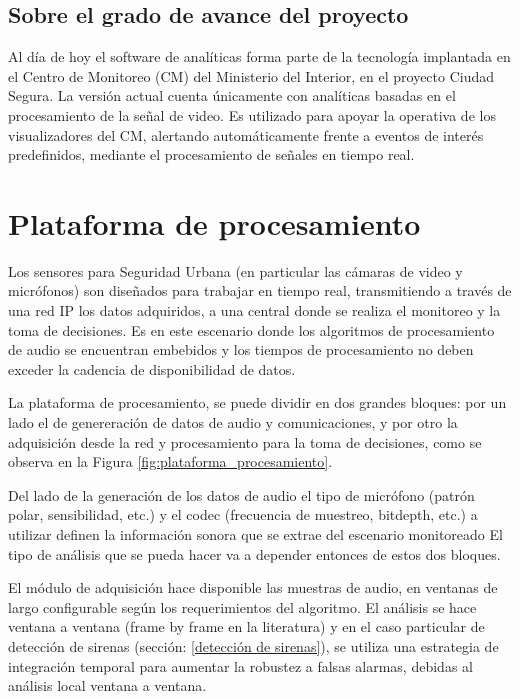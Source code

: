 \documentclass{article}
\begin{document}
\subsection{Sobre el grado de avance del proyecto}                            
Al día de hoy el software de analíticas forma parte de la tecnología implantada en el Centro de Monitoreo (CM) del Ministerio del Interior, en el proyecto Ciudad Segura. La versión actual cuenta únicamente con analíticas basadas en el procesamiento de la señal de video. Es utilizado para apoyar la operativa de los visualizadores del CM, alertando automáticamente frente a eventos de interés predefinidos, mediante el procesamiento de señales en tiempo real.  



\section{Plataforma de procesamiento}
\label{PP}
Los sensores para Seguridad Urbana (en particular las cámaras de video y micrófonos) son diseñados para trabajar en tiempo real, transmitiendo a través de una red IP los datos adquiridos, a una central donde se realiza el monitoreo y la toma de decisiones. Es en este escenario donde los algoritmos de procesamiento de audio se encuentran embebidos y los tiempos de procesamiento no deben exceder la cadencia de disponibilidad de datos.

\smallskip
La plataforma de procesamiento, se puede dividir en dos grandes bloques: por un lado el de genereración de datos de audio y comunicaciones, y por otro la adquisición desde la red y procesamiento para la toma de decisiones, como se observa en la Figura \ref{fig:plataforma_procesamiento}.
\smallskip

Del lado de la generación de los datos de audio el tipo de micrófono (patrón polar, sensibilidad, etc.) y el codec (frecuencia de muestreo, bitdepth, etc.) a utilizar definen la información sonora que se extrae del escenario monitoreado El tipo de análisis que se pueda hacer va a depender entonces de estos dos bloques.
\smallskip

El módulo de adquisición hace disponible las muestras de audio, en ventanas de largo configurable según los requerimientos del algoritmo. El análisis se hace ventana a ventana (frame by frame en la literatura) y en el caso particular de detección de sirenas (sección: \ref{detección de sirenas}), se utiliza una estrategia de integración temporal para aumentar la robustez a falsas alarmas, debidas al análisis local ventana a ventana.
\end{document}
